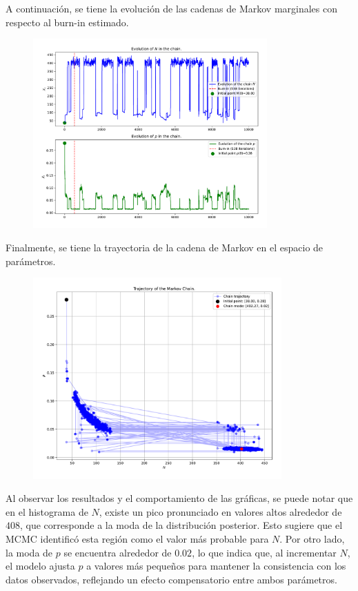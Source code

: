 A continuación, se tiene la evolución de las cadenas de Markov marginales con respecto al burn-in estimado.
\begin{figure}[h!]
	\centering
	\includegraphics[width=0.8\textwidth]{IMAGENES/marginal_evolution_ex1.pdf}
\end{figure}

Finalmente, se tiene la trayectoria de la cadena de Markov en el espacio de parámetros.
\begin{figure}[h!]
	\centering
	\includegraphics[width=0.85\textwidth]{IMAGENES/trayectory_ex1.pdf}
\end{figure}

Al observar los resultados y el comportamiento de las gráficas, se puede notar que en el histograma de $N$, existe un pico pronunciado en valores altos alrededor de $408$, que corresponde a la moda de la distribución posterior. Esto sugiere que el MCMC identificó esta región como el valor más probable para $N$. Por otro lado, la moda de $p$ se encuentra alrededor de $0.02$, lo que indica que, al incrementar $N$, el modelo ajusta $p$ a valores más pequeños para mantener la consistencia con los datos observados, reflejando un efecto compensatorio entre ambos parámetros.

